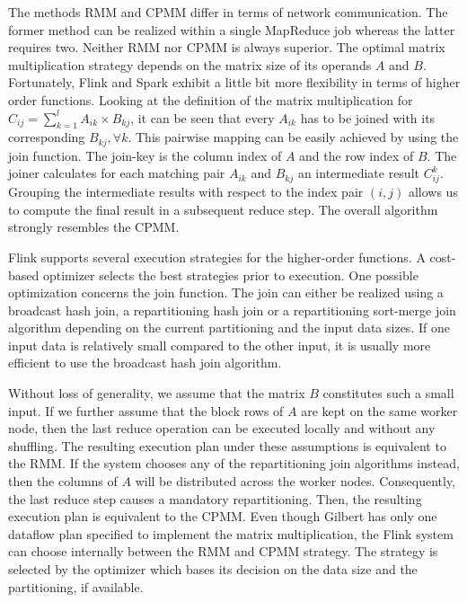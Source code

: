 The methods RMM and CPMM differ in terms of network communication. 
The former method can be realized within a single MapReduce job whereas the latter requires two. 
Neither RMM nor CPMM is always superior. 
The optimal matrix multiplication strategy depends on the matrix size of its operands $A$ and $B$. 
Fortunately, Flink and Spark exhibit a little bit more flexibility in terms of higher order functions. 
Looking at the definition of the matrix multiplication for $C_{ij}=\sum_{k=1}^{l}A_{ik}\times B_{kj}$, it can be seen that every $A_{ik}$ has to be joined with its corresponding $B_{kj},\forall k$. 
This pairwise mapping can be easily achieved by using the join function. 
The join-key is the column index of $A$ and the row index of $B$. 
The joiner calculates for each matching pair $A_{ik}$ and $B_{kj}$ an intermediate result $C_{ij}^k$. 
Grouping the intermediate results with respect to the index pair $(i,j)$ allows us to compute the final result in a subsequent reduce step. 
The overall algorithm strongly resembles the CPMM. 

Flink supports several execution strategies for the higher-order functions. 
A cost-based optimizer selects the best strategies prior to execution. 
One possible optimization concerns the join function. 
The join can either be realized using a broadcast hash join, a repartitioning hash join or a repartitioning sort-merge join algorithm depending on the current partitioning and the input data sizes. 
If one input data is relatively small compared to the other input, it is usually more efficient to use the broadcast hash join algorithm. 

Without loss of generality, we assume that the matrix $B$ constitutes such a small input. 
If we further assume that the block rows of $A$ are kept on the same worker node, then the last reduce operation can be executed locally and without any shuffling. 
The resulting execution plan under these assumptions is equivalent to the RMM. 
If the system chooses any of the repartitioning join algorithms instead, then the columns of $A$ will be distributed across the worker nodes. 
Consequently, the last reduce step causes a mandatory repartitioning. 
Then, the resulting execution plan is equivalent to the CPMM. 
Even though Gilbert has only one dataflow plan specified to implement the matrix multiplication, the Flink system can choose internally between the RMM and CPMM strategy. 
The strategy is selected by the optimizer which bases its decision on the data size and the partitioning, if available.